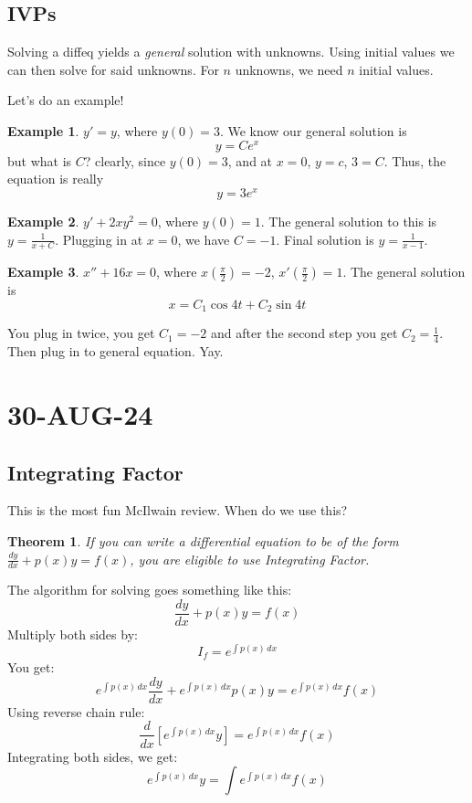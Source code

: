 \documentclass[10pt, oneside]{article}
\newtheorem{thm}{Theorem}
\theoremstyle{definition}
\newtheorem{example}{Example}[section]
\begin{document}
 \subsection{IVPs}
 Solving a diffeq yields a \textit{general} solution with unknowns. Using initial values we can then solve for said unknowns. For $n$ unknowns, we need $n$ initial values. 

 Let's do an example!
 \begin{example}
    $y' = y$, where $y(0) = 3$.
    We know our general solution is 
    \[y = Ce^x\]
    but what is $C$?
    clearly, since $y(0) = 3$, and at $x = 0$, $y=c$, $3 = C$. Thus, the equation is really 
    \[y = 3e^x\]
 \end{example}
 \begin{example}
    $y' + 2xy^2 = 0$, where $y(0)=1$.
    The general solution to this is $y = \frac{1}{x+C}$. Plugging in at $x=0$, we have $C=-1$. Final solution is $y = \frac{1}{x-1}$.
 \end{example}
 \begin{example}
    $x'' + 16x = 0$, where $x(\frac{\pi}{2})= -2$, $x'(\frac{\pi}{2}) = 1$. The general solution is 
    \[x = C_1\cos{4t}+C_2\sin{4t}\]

    You plug in twice, you get $C_1 = -2$ and after the second step you get $C_2 = \frac{1}{4}$. Then plug in to general equation. Yay.
\end{example}
\section{30-AUG-24}
\subsection{Integrating Factor}
This is the most fun McIlwain review. When do we use this?
\begin{thm}
    If you can write a differential equation to be of the form $\frac{dy}{dx} + p(x)y = f(x)$, you are eligible to use Integrating Factor.
\end{thm}

The algorithm for solving goes something like this:
\[
\frac{dy}{dx} + p(x)y = f(x)
\]
Multiply both sides by:
\[
I_f = e^{\int{p(x) \, dx}}
\]
You get:
\[
e^{\int{p(x) \, dx}} \frac{dy}{dx} + e^{\int{p(x) \, dx}} p(x) y = e^{\int{p(x) \, dx}} f(x)
\]
Using reverse chain rule:
\[
\frac{d}{dx}[e^{\int{p(x) \, dx}}y]= e^{\int{p(x) \, dx}} f(x)
\]
Integrating both sides, we get:
\[
    e^{\int{p(x) \, dx}}y = \int{e^{\int{p(x) \, dx}} f(x)}
\]
\end{document}
